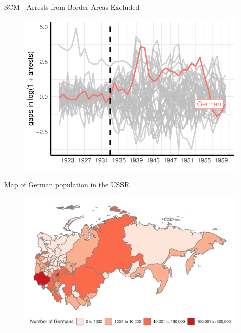 \documentclass[11pt]{beamer}
\begin{document}
\begin{frame}[label=sc_non_border_area]{SCM - Arrests from Border Areas Excluded}
 \begin{figure}[h]
\centering
\includegraphics[width=1\textwidth]{placebo_highlight_all_non_border_provinces.pdf}
\end{figure}
\hyperlink{sc_robustness_checks}{}
\end{frame}






\begin{frame}[label=map_counts]{Map of German population in the USSR}
 \begin{figure}[h]
\centering
\includegraphics[width=1\textwidth]{map_number_of_germans_discrete.pdf}
\end{figure}
\hyperlink{add_content}{}
\end{frame}
\end{document}
